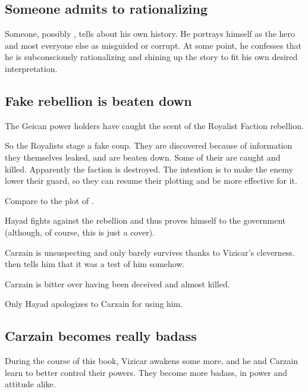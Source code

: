 






\subsection{Someone admits to rationalizing}
Someone, possibly \Ishnaruchaefir, tells about his own history. He portrays himself as the hero and most everyone else as misguided or corrupt. At some point, he confesses that he is subconsciously rationalizing and shining up the story to fit his own desired interpretation. 







\subsection{Fake rebellion is beaten down}
The Geican power holders have caught the scent of the Royalist Faction rebellion. 

So the Royalists stage a fake coup. They are discovered because of information they themselves leaked, and are beaten down. Some of their  are caught and killed. Apparently the faction is destroyed. The intention is to make the enemy lower their guard, so they can resume their plotting and be more effective for it. 

Compare to the plot of . 

Hayad fights against the rebellion and thus proves himself  to the government (although, of course, this is just a cover). 

Carzain is unsuspecting and only barely survives thanks to Vizicar's cleverness. \Belzir{} then tells him that it was a test of him somehow. 

Carzain is bitter over having been deceived and almost killed. 

Only Hayad apologizes to Carzain for using him. 







\subsection{Carzain becomes really badass}
During the course of this book, Vizicar awakens some more, and he and Carzain learn to better control their powers. They become more badass, in power and attitude alike. 

